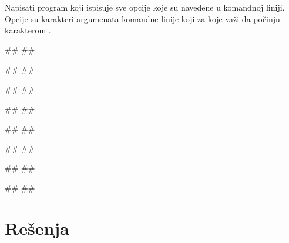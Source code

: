 \begin{Exercise}[label=v2.2_01] 
Napisati program koji ispisuje sve opcije koje su navedene u komandnoj liniji. Opcije su karakteri argumenata komandne linije koji za koje važi da počinju karakterom \kckod{-}.
 
\begin{miditest}
\begin{upotreba}{1}
#\naslovPokretanje#
##

#\naslovIzlaz#
##
\end{upotreba}
\end{miditest}
\begin{miditest}
\begin{upotreba}{2}
#\naslovPokretanje#
##

#\naslovIzlaz#
##
\end{upotreba}
\end{miditest}

\begin{miditest}
\begin{upotreba}{3}
#\naslovPokretanje#
##

#\naslovIzlaz#
##
\end{upotreba}
\end{miditest}
\begin{miditest}
\begin{upotreba}{4}
#\naslovPokretanje#
##

#\naslovIzlaz#
##
\end{upotreba}
\end{miditest}

\end{Exercise}
\ifresenja
\begin{Answer}[ref=v2.2_01]
\end{Answer}
 \fi


\ifresenja
\sstrana
\section{Rešenja}
\shipoutAnswer
\fi
